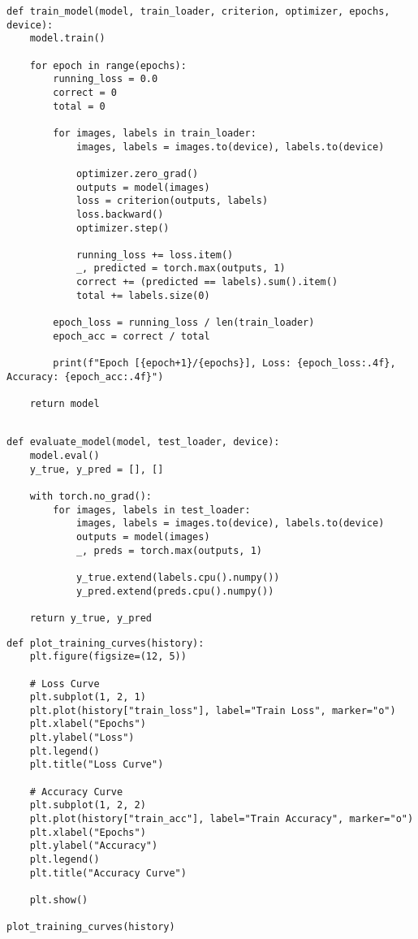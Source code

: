 \documentclass{article}
\begin{document}
\begin{verbatim}
def train_model(model, train_loader, criterion, optimizer, epochs, device):
    model.train()

    for epoch in range(epochs):
        running_loss = 0.0
        correct = 0
        total = 0

        for images, labels in train_loader:
            images, labels = images.to(device), labels.to(device)

            optimizer.zero_grad()
            outputs = model(images)
            loss = criterion(outputs, labels)
            loss.backward()
            optimizer.step()

            running_loss += loss.item()
            _, predicted = torch.max(outputs, 1)
            correct += (predicted == labels).sum().item()
            total += labels.size(0)

        epoch_loss = running_loss / len(train_loader)
        epoch_acc = correct / total

        print(f"Epoch [{epoch+1}/{epochs}], Loss: {epoch_loss:.4f}, Accuracy: {epoch_acc:.4f}")

    return model


\end{verbatim}

\begin{verbatim}
def evaluate_model(model, test_loader, device):
    model.eval()
    y_true, y_pred = [], []

    with torch.no_grad():
        for images, labels in test_loader:
            images, labels = images.to(device), labels.to(device)
            outputs = model(images)
            _, preds = torch.max(outputs, 1)

            y_true.extend(labels.cpu().numpy())
            y_pred.extend(preds.cpu().numpy())

    return y_true, y_pred

\end{verbatim}

\begin{verbatim}
def plot_training_curves(history):
    plt.figure(figsize=(12, 5))

    # Loss Curve
    plt.subplot(1, 2, 1)
    plt.plot(history["train_loss"], label="Train Loss", marker="o")
    plt.xlabel("Epochs")
    plt.ylabel("Loss")
    plt.legend()
    plt.title("Loss Curve")

    # Accuracy Curve
    plt.subplot(1, 2, 2)
    plt.plot(history["train_acc"], label="Train Accuracy", marker="o")
    plt.xlabel("Epochs")
    plt.ylabel("Accuracy")
    plt.legend()
    plt.title("Accuracy Curve")

    plt.show()

plot_training_curves(history)

\end{verbatim}
\end{document}
